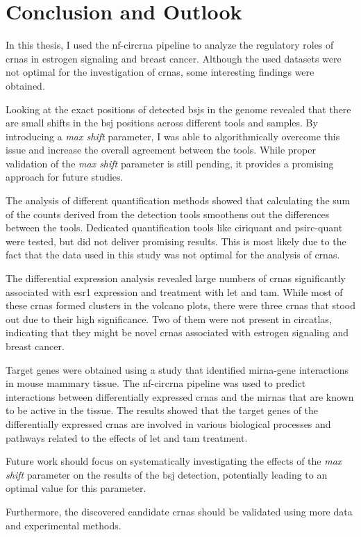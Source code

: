 \chapter{Conclusion and Outlook}

In this thesis, I used the \gls{nf-circrna} pipeline to analyze the regulatory
roles of \glspl{crna} in estrogen signaling and breast cancer.
Although the used datasets were not optimal for the investigation of
\glspl{crna}, some interesting findings were obtained.

Looking at the exact positions of detected \glspl{bsj} in the genome revealed
that there are small shifts in the \gls{bsj} positions across different tools
and samples.
By introducing a \textit{max shift} parameter, I was able to algorithmically
overcome this issue and increase the overall agreement between the tools.
While proper validation of the \textit{max shift} parameter is still pending,
it provides a promising approach for future studies.

The analysis of different quantification methods showed that calculating the
sum of the counts derived from the detection tools smoothens out the
differences between the tools.
Dedicated quantification tools like \gls{ciriquant} and \gls{psirc-quant} were
tested, but did not deliver promising results.
This is most likely due to the fact that the data used in this study was not
optimal for the analysis of \glspl{crna}.

The differential expression analysis revealed large numbers of \glspl{crna}
significantly associated with \gls{esr1} expression and treatment with
\gls{let} and \gls{tam}.
While most of these \glspl{crna} formed clusters in the volcano plots, there
were three \glspl{crna} that stood out due to their high significance.
Two of them were not present in \gls{circatlas}, indicating that they might be
novel \glspl{crna} associated with estrogen signaling and breast cancer.

Target genes were obtained using a study that identified \gls{mirna}-gene
interactions in mouse mammary tissue.
The \gls{nf-circrna} pipeline was used to predict interactions between
differentially expressed \glspl{crna} and the \glspl{mirna} that are known to
be active in the tissue.
The results showed that the target genes of the differentially expressed
\glspl{crna} are involved in various biological processes and pathways related
to the effects of \gls{let} and \gls{tam} treatment.

Future work should focus on systematically investigating the effects of the
\textit{max shift} parameter on the results of the \gls{bsj} detection,
potentially leading to an optimal value for this parameter.

Furthermore, the discovered candidate \glspl{crna} should be validated using
more data and experimental methods.

